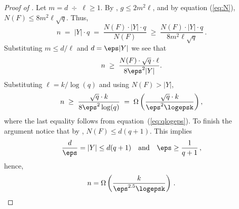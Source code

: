 \begin{proof}[Proof of ]
Let $m = d \;\div\; \ell \ge 1$. By , $g \le
2m^2 \ell$, and by equation (\ref{eq:N}), $N(F) \le 8m^2 \ell \sqrt{q}$.
Thus,
\begin{equation*}
n \;=\; |Y| \cdot q \;=\; \frac{N(F) \cdot |Y| \cdot q}{N(F)} \;\ge\;
\frac{N(F) \cdot |Y| \cdot q}{8m^2 \ell \sqrt{q}}\,.
\end{equation*}
Substituting $m \le d/\ell$ and $d=\eps |Y|$ we see that
\begin{equation*}
n \;\ge\;  \frac{N(F) \cdot \sqrt{q} \cdot \ell}{8 \eps^2 |Y|}.
\end{equation*}
Substituting $\ell = {k}/{\log(q)}$ and using $N(F) > |Y|$,
\begin{equation*}
n\;\ge\;  \frac{\sqrt{q} \cdot k}{8 \eps^2 \log (q)} \;=\;
\Omega\left(\frac{\sqrt{q} \cdot k}{\eps^2 \logepsk}\right),
\end{equation*}
where the last equality follows from equation~(\ref{eq:qlogeps}). To
finish the argument notice that by , $N(F)
\le d(q+1)$. This implies
\[
\frac{d}{\eps} =|Y| \le d(q+1)\quad \text{and} \quad \eps
\ge \frac{1}{q+1}\,,\]
hence,
\[
n =\Omega\left( \frac{k}{\eps^{2.5}
\logepsk}\right)\,.\qedhere
\]
\end{proof}


